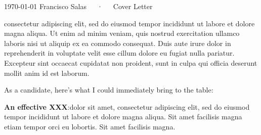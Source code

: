 \documentclass[12pt, a4paper]{awesome-cv}
\begin{document}
	
	\makecvheader[R]
	
	\makecvfooter
	{\today}
	{Francisco Salas~~~·~~~Cover Letter}
	{}
	
	\makelettertitlenew
	
	\begin{cvletter}
		
		consectetur adipiscing elit, sed do eiusmod tempor incididunt ut labore et dolore magna aliqua. Ut enim ad minim veniam, quis nostrud exercitation ullamco laboris nisi ut aliquip ex ea commodo consequat. Duis aute irure dolor in reprehenderit in voluptate velit esse cillum dolore eu fugiat nulla pariatur. Excepteur sint occaecat cupidatat non proident, sunt in culpa qui officia deserunt mollit anim id est laborum.
			
		As a candidate, here’s what I could immediately bring to the table:
		
		\textbf{An effective XXX}:dolor sit amet, consectetur adipiscing elit, sed do eiusmod tempor incididunt ut labore et dolore magna aliqua. Sit amet facilisis magna etiam tempor orci eu lobortis. Sit amet facilisis magna. 
		\end{cvletter}
	
	
	\makeletterclosing
	
\end{document}

